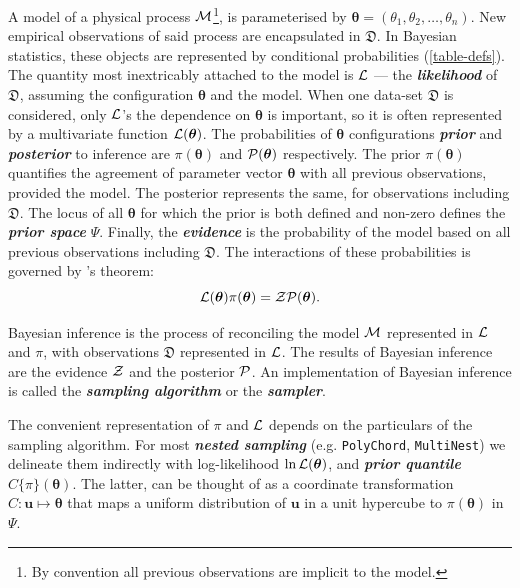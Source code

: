 \documentclass[usenatbib]{mnras}
\begin{document}
A model of a physical process \({\cal M}\)\footnote{By convention all
  previous observations are implicit to the model. }, is parameterised
by \(\bm{\theta} = (\theta_{1}, \theta_{2}, \ldots , \theta_{n})\).
New empirical observations of said process are encapsulated in
\(\mathfrak{D}\). In Bayesian statistics, these objects are
represented by conditional probabilities (\cref{table-defs}). The
quantity most inextricably attached to the model is ${\cal L}$ --- the
\textbf{\emph{likelihood}} of \(\mathfrak{D}\), assuming the configuration
$\bm{\theta}$ and the model. When one data-set \(\mathfrak{D}\) is
considered, only ${\cal L}$'s the dependence on $\bm{\theta}$ is
important, so it is often represented by a multivariate function
${\cal L}(\bm{\theta})$. The probabilities of $\bm{\theta}$
configurations \textbf{\emph{prior}} and \textbf{\emph{posterior}} to inference are
$\pi(\bm{\theta})$ and ${\cal P}(\bm{\theta})$ respectively. The prior
\(\pi(\bm{\theta})\) quantifies the agreement of parameter vector
$\bm{\theta}$ with all previous observations, provided the model. The
posterior represents the same, for observations including
\(\mathfrak{D}\). The locus of all $\bm{\theta}$ for which the prior
is both defined and non-zero defines the \textbf{\emph{prior space}}
$\Psi$. Finally, the \textbf{\emph{evidence}} is the probability of the model
based on all previous observations including \(\mathfrak{D}\). The
interactions of these probabilities is governed by \citeauthor{1763}'s
theorem:
\begin{equation}\label{eq:bayes} 
 {\cal L}(\bm{\theta})  \pi (\bm{\theta}) = {\cal Z}  {\cal P} (\bm{\theta}).  
\end{equation}

Bayesian inference is the process of reconciling the model ${\cal M}$
represented in ${\cal L}$ and $\pi$, with observations
\(\mathfrak{D}\) represented in ${\cal L}$. The results of Bayesian
inference are the evidence ${\cal Z}$ and the posterior ${\cal P}$. An
implementation of Bayesian inference is called the \textbf{\emph{sampling
  algorithm}} or the \textbf{\emph{sampler}}.

The convenient representation of $\pi$ and ${\cal L}$ depends on the
particulars of the sampling algorithm. For most \textbf{\emph{nested sampling}}
(e.g. \texttt{PolyChord}, \texttt{MultiNest}) we delineate them
indirectly with log-likelihood \(\ln \cal L (\bm{\theta})\), and
\textbf{\emph{prior quantile}} \(C\{\pi\}(\bm{\theta})\). The latter, can be
thought of as a coordinate transformation
$C: \bm{u} \mapsto \bm{\theta}$ that maps a uniform distribution of
$\bm{u}$ in a unit hypercube to $\pi(\bm{\theta})$ in $\Psi$.
\end{document}
